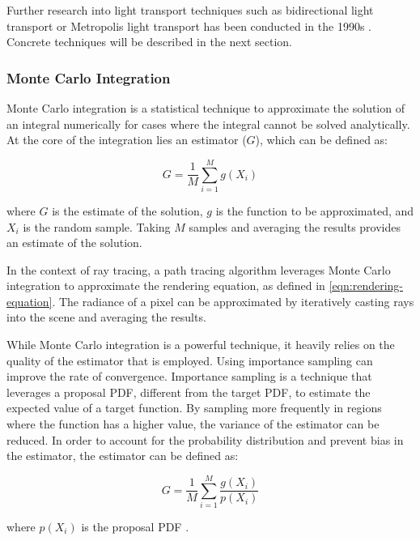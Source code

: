 Further research into light transport techniques such as bidirectional light transport or Metropolis light transport has been conducted in the 1990s \cite{veachMonteCarloLightTransport}. Concrete techniques will be described in the next section.

\newpage
\subsubsection{Monte Carlo Integration}
\label{sec:monte-carlo-integration-sampling}

Monte Carlo integration is a statistical technique to approximate the solution of an integral numerically for cases where the integral cannot be solved analytically. At the core of the integration lies an estimator ($G$), which can be defined as:

\begin{equation}
  G = \frac{1}{M}\sum_{i=1}^M g(X_i)
  \label{eq:monteCarlo}
\end{equation}

where $G$ is the estimate of the solution, $g$ is the function to be approximated, and $X_i$ is the random sample. Taking $M$ samples and averaging the results provides an estimate of the solution. \cite{kalos2009monte}

In the context of ray tracing, a path tracing algorithm leverages Monte Carlo integration to approximate the rendering equation, as defined in \autoref{eqn:rendering-equation}. The radiance of a pixel can be approximated by iteratively casting rays into the scene and averaging the results.

While Monte Carlo integration is a powerful technique, it heavily relies on the quality of the estimator that is employed. Using importance sampling can improve the rate of convergence. Importance sampling is a technique that leverages a proposal \gls{PDF}, different from the target \gls{PDF}, to estimate the expected value of a target function. By sampling more frequently in regions where the function has a higher value, the variance of the estimator can be reduced. In order to account for the probability distribution and prevent bias in the estimator, the estimator can be defined as:

\begin{equation}
  G = \frac{1}{M}\sum_{i=1}^M \frac{g(X_i)}{p(X_i)}
  \label{eq:importanceSampling}
\end{equation}

where $p(X_i)$ is the proposal \gls{PDF} \cite{Pharr_Physically_Based_Rendering_2023}.

